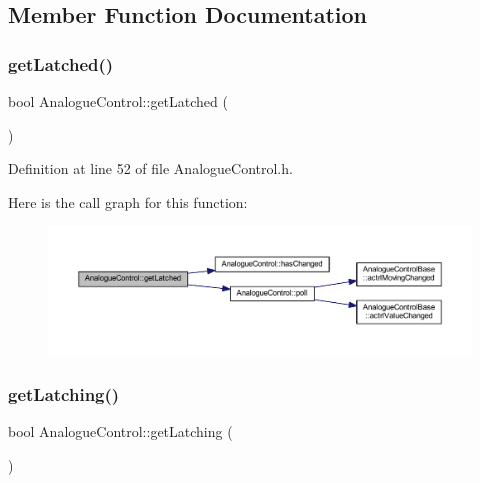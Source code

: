 \subsection{Member Function Documentation}
\mbox{\label{class_analogue_control_a0fd8ee45aa916be0b7ba0bdccab41033}} 
\subsubsection{\texorpdfstring{get\+Latched()}{getLatched()}}
{\footnotesize\ttfamily bool Analogue\+Control\+::get\+Latched (\begin{DoxyParamCaption}{ }\end{DoxyParamCaption})\hspace{0.3cm}{\ttfamily [inline]}}



Definition at line 52 of file Analogue\+Control.\+h.

Here is the call graph for this function\+:
\nopagebreak
\begin{figure}[H]
\begin{center}
\leavevmode
\includegraphics[width=350pt]{dc/daa/class_analogue_control_a0fd8ee45aa916be0b7ba0bdccab41033_cgraph}
\end{center}
\end{figure}
\mbox{\label{class_analogue_control_a69b90c306b7831a3addb30b6683ec171}} 
\subsubsection{\texorpdfstring{get\+Latching()}{getLatching()}}
{\footnotesize\ttfamily bool Analogue\+Control\+::get\+Latching (\begin{DoxyParamCaption}{ }\end{DoxyParamCaption})\hspace{0.3cm}{\ttfamily [inline]}}



